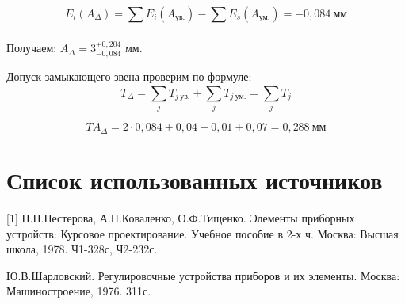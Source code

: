 \documentclass[14pt,a4paper,russian]{scrartcl}
\begin{document}
        \[ E_i(A_\Delta) = \sum_{}^{}E_i(A_{\text{ув.}}) - \sum_{}^{}E_s(A_{\text{ум.}}) = -0,084\ \text{мм}\]
        
        Получаем: \( A_\Delta = 3_{-0,084}^{+0,204} \) мм.
        

        Допуск замыкающего звена проверим по формуле:
        \[ T_\Delta = \sum_{j}^{}T_{j\ \text{ув.}} + \sum_{j}^{}T_{j\ \text{ум.}} = \sum_{j}^{}T_j \]
        
        \[ T A_\Delta = 2\cdot 0,084 + 0,04 + 0,01 + 0,07 = 0,288\ \text{мм} \]
        
        
        
        

        
        
        
        
        
        
        
        

        
        
\newpage
\section*{Список использованных источников}
% 
        
[1] Н.П.Нестерова, А.П.Коваленко, О.Ф.Тищенко. 
    Элементы приборных устройств: Курсовое проектирование. Учебное пособие в 2-х ч.
    Москва: Высшая школа, 1978. Ч1-328с, Ч2-232с. \par
[2] Ю.В.Шарловский. Регулировочные устройства приборов и их элементы. 
    Москва: Машиностроение, 1976. 311с.
\end{document}
